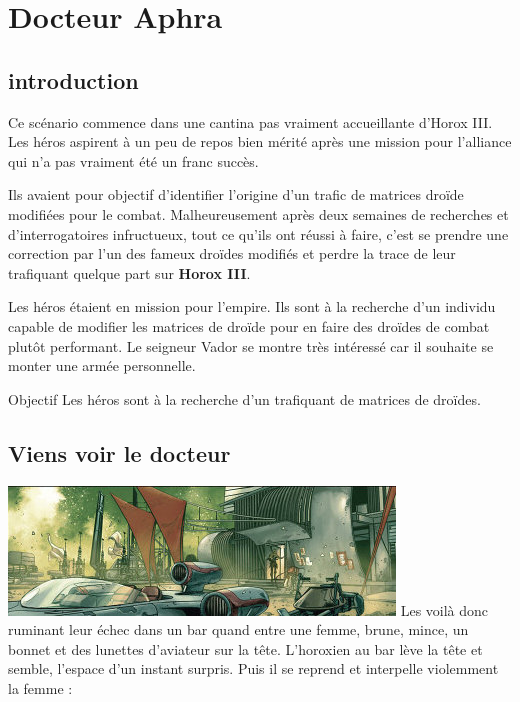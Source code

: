 \section{Docteur Aphra}

\subsection{introduction}
Ce scénario commence dans une cantina pas vraiment accueillante d’Horox III. Les héros aspirent à un peu de repos bien mérité après une mission pour l’alliance qui n’a pas vraiment été un franc succès.

\lettrine{\jedifont{\$}} Ils avaient pour objectif d’identifier l’origine d’un trafic de matrices droïde modifiées pour le combat. Malheureusement après deux semaines de recherches et d’interrogatoires infructueux, tout ce qu’ils ont réussi à faire, c’est se prendre une correction par l’un des fameux droïdes modifiés et perdre la trace de leur trafiquant quelque part sur \textbf{Horox III}.

\lettrine{\jedifont{\#}} Les héros étaient en mission pour l’empire. Ils sont à la recherche d’un individu capable de modifier les matrices de droïde pour en faire des droïdes de combat plutôt performant. Le seigneur Vador se montre très intéressé car il souhaite se monter une armée personnelle.

\begin{paperbox}{Objectif}
Les héros sont à la recherche d’un trafiquant de matrices de droïdes.
\end{paperbox}

\subsection{Viens voir le docteur}
\noindent\includegraphics[width=\linewidth]{_img/places/cantina-horox-iii.jpg}
Les voilà donc ruminant leur échec dans un bar quand entre une femme, brune, mince, un bonnet et des lunettes d’aviateur sur la tête. L’horoxien au bar lève la tête et semble, l’espace d’un instant surpris. Puis il se reprend et interpelle violemment la femme :

